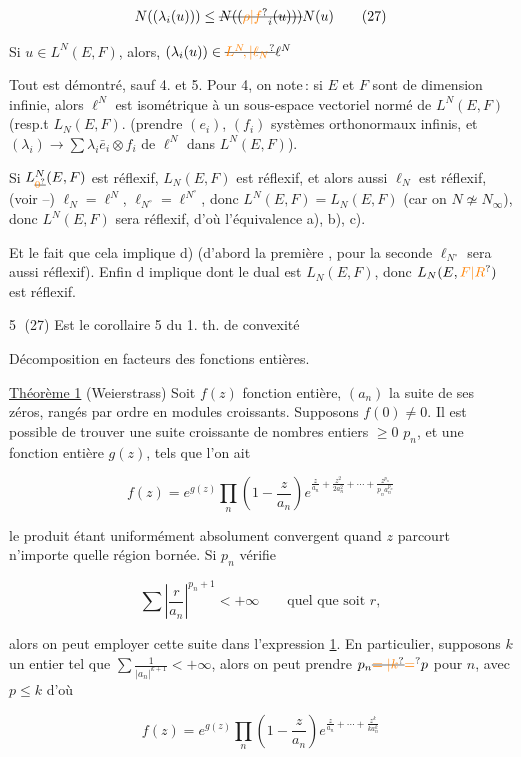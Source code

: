 \[
N((\lambda_i(u)))\leq\deleted{N((\unsure{\rho|f}_i(u)))}N(u)\tag*{(27)}
\]

Si $u\in L^N(E,F)$,  alors, $(\lambda_i(u))\in\deleted{\unsure{L^N\!,|\ell_N}}\ell^N$ 

Tout est démontré, sauf 4.  et 5. Pour 4, on note\,: si $E$ et $F$ sont de dimension infinie, alors $\ell^N$  est isométrique à un sous-espace vectoriel normé de $L^N(E,F)$ (resp.t $L_N(E,F)$. (prendre $(e_i)$, $(f_i)$ systèmes orthonormaux infinis, et $(\lambda_i)\to\sum\lambda_i\bar e_i\otimes f_i$ de $\ell^N$ dans $L^N(E,F)$). 

Si $L^N_{\deleted{\unsure{0}}}(E,F)$ est réflexif, $L_N(E,F)$ est réflexif, et alors aussi $\ell_N$ est réflexif,  (voir --) $\ell_N=\ell^N$, $\ell_{N^\circ}=\ell^{N^\circ}$, donc $L^N(E,F)=L_N(E,F)$ (car on   $N\not\simeq N_\infty$), donc $L^N(E,F)$ sera réflexif, d'où l'équivalence a), b), c).

Et le fait que cela implique d) (d'abord la première , pour la seconde  $\ell_{N^\circ}$ sera aussi réflexif). Enfin d implique   dont le dual est $L_N(E,F)$, donc $L_N(E,\unsure{F|R})$ est réflexif.

\textcircled{5} (27) Est le corollaire 5 du 1. th. de convexité 

Décomposition en facteurs des fonctions entières.

\uline{Théorème 1} (Weierstrass) Soit $f(z)$ fonction entière, $(a_n)$ la suite de ses zéros, rangés par ordre en modules croissants. Supposons $f(0)\ne0$. Il est possible de trouver une suite croissante de nombres entiers $\geq0$ $p_n$, et une fonction entière $g(z)$, tels que l'on ait

\[
 f(z)=e^{g(z)}\prod_n\left(1-\frac{z}{a_n}\right)e^{\frac{z}{a_n}+\frac{z^2}{2a_n^2}+\cdots+\frac{z^{p_n}}{p_n a_n^{p_n}}} \tag*{(1)}
\]

le produit étant uniformément absolument convergent quand $z$ parcourt n'importe quelle région bornée. Si   $p_n$ vérifie

\[
 \sum\left|\frac{r}{a_n}\right|^{p_n+1}<+\infty\qquad\text{quel que soit }r,
\]

alors on peut employer cette suite dans l'expression \uline{1}. En particulier, supposons $k$ un entier tel que $\sum\frac{1}{|a_n|^{k+1}}<+\infty$, alors on peut prendre $p_n\deleted{\unsure{=|k}}\unsure{=}p$ pour  $n$, avec $p\leq k$ d'où

\[
 f(z)=e^{g(z)}\prod_n\left(1-\frac{z}{a_n}\right)e^{\frac{z}{a_n}+\cdots+\frac{z^k}{ka_n^k}} \tag*{(2)}
\]

